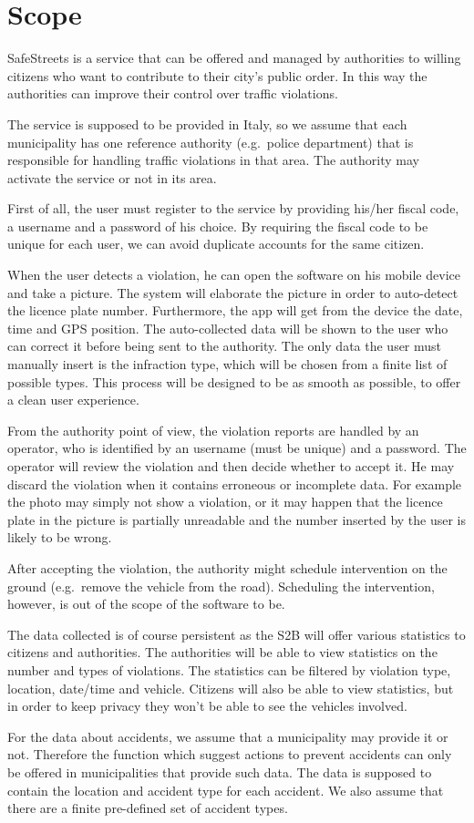 \section{Scope}
SafeStreets is a service that can be offered and managed by authorities
to willing citizens who want to contribute to their city’s public order.
In this way the authorities can improve their control over traffic violations.

The service is supposed to be provided in Italy, so we assume that each
municipality has one reference authority (e.g.\ police department) that is
responsible for handling traffic violations in that area.
The authority may activate the service or not in its area.


First of all, the user must register to the service by providing his/her 
fiscal code, a username and a password of his choice.
By requiring the fiscal code to be unique for each user, we can avoid
duplicate accounts for the same citizen.

When the user detects a violation, he can open the software on his mobile 
device and take a picture. The system will elaborate the picture in order to 
auto-detect the licence plate number. Furthermore, the app will get from the 
device the date, time and GPS position. The auto-collected data will be shown 
to the user who can correct it before being sent to the authority.
The only data the user must manually insert is the infraction type, which 
will be chosen from a finite list of possible types.
This process will be designed to be as smooth as possible, to offer a clean 
user experience.

From the authority point of view, the violation reports are handled by
an operator, who is identified by an username (must be unique) and
a password.
The operator will review the violation and then decide whether to accept it.
He may discard the violation when it contains erroneous or incomplete data.
For example the photo may simply not show a violation, or it may happen that
the licence plate in the picture is partially unreadable and the number
inserted by the user is likely to be wrong.

After accepting the violation, the authority might schedule intervention
on the ground (e.g.\ remove the vehicle from the road).
Scheduling the intervention, however, is out of the scope of the software
to be.

The data collected is of course persistent as the S2B will offer various
statistics to citizens and authorities.
The authorities will be able to view statistics on the number and types of
violations.
The statistics can be filtered by violation type, location, date/time and
vehicle.
Citizens will also be able to view statistics, but in order to keep privacy
they won't be able to see the vehicles involved.

For the data about accidents, we assume that a municipality may provide it
or not. Therefore the function which suggest actions to prevent accidents
can only be offered in municipalities that provide such data.
The data is supposed to contain the location and accident type for each accident.
We also assume that there are a finite pre-defined set of accident types.